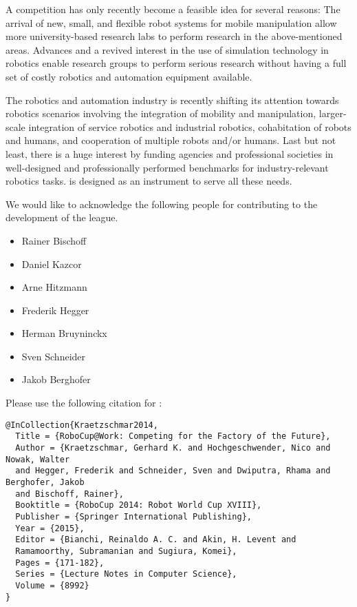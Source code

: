 A \RCAW competition has only recently become a feasible idea for several reasons: The arrival of new, small, and flexible robot systems for mobile manipulation allow more university-based research labs to perform research in the above-mentioned areas. Advances and a revived interest in the use of simulation technology in robotics enable research groups to perform serious research without having a full set of costly robotics and automation equipment available.
\par

The robotics and automation industry is recently shifting its attention towards robotics scenarios involving the integration of mobility and manipulation, larger-scale integration of service robotics and industrial robotics, cohabitation of robots and humans, and cooperation of multiple robots and/or humans. Last but not least, there is a huge interest by funding agencies and professional societies in well-designed and professionally performed benchmarks for industry-relevant robotics tasks. \RCAW is designed as an instrument to serve all these needs.
\par
We would like to acknowledge the following people for contributing to the development
of the \RCAW league.

\begin{itemize}
	\item Rainer Bischoff
	\item Daniel Kazcor
	\item Arne Hitzmann
	\item Frederik Hegger
	\item Herman Bruyninckx
	\item Sven Schneider
	\item Jakob Berghofer
\end{itemize}

Please use the following citation for \RCAW:
\begin{verbatim}
@InCollection{Kraetzschmar2014,
  Title = {RoboCup@Work: Competing for the Factory of the Future},
  Author = {Kraetzschmar, Gerhard K. and Hochgeschwender, Nico and Nowak, Walter
  and Hegger, Frederik and Schneider, Sven and Dwiputra, Rhama and Berghofer, Jakob
  and Bischoff, Rainer},
  Booktitle = {RoboCup 2014: Robot World Cup XVIII},
  Publisher = {Springer International Publishing},
  Year = {2015},
  Editor = {Bianchi, Reinaldo A. C. and Akin, H. Levent and
  Ramamoorthy, Subramanian and Sugiura, Komei},
  Pages = {171-182},
  Series = {Lecture Notes in Computer Science},
  Volume = {8992}
}
\end{verbatim}
